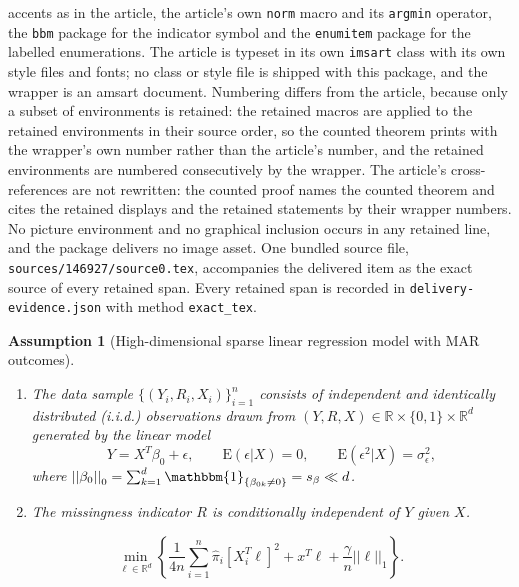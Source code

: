 \documentclass[10pt,a4paper]{amsart}
\theoremstyle{plain}
\newtheorem{assumption}{Assumption}
\theoremstyle{remark}
\renewcommand{\hat}{\widehat}
\newcommand{\norm}[1]{\left|\left| #1 \right|\right|}
\begin{document}
accents as in the article, the article's own \texttt{norm} macro and its \texttt{argmin} operator, the \texttt{bbm} package for the indicator symbol and the \texttt{enumitem} package for the labelled enumerations. The article is typeset in its own \texttt{imsart} class with its own style files and fonts; no class or style file is shipped with this package, and the wrapper is an amsart document. Numbering differs from the article, because only a subset of environments is retained: the retained macros are applied to the retained environments in their source order, so the counted theorem prints with the wrapper's own number rather than the article's number, and the retained environments are numbered consecutively by the wrapper. The article's cross-references are not rewritten: the counted proof names the counted theorem and cites the retained displays and the retained statements by their wrapper numbers. No picture environment and no graphical inclusion occurs in any retained line, and the package delivers no image asset. One bundled source file, \texttt{sources/146927/source0.tex}, accompanies the delivered item as the exact source of every retained span. Every retained span is recorded in \texttt{delivery-evidence.json} with method \texttt{exact\_tex}.
\begin{assumption}[High-dimensional sparse linear regression model with MAR outcomes] 
	\leavevmode %
	\begin{enumerate}[label=(\alph*)]
		\label{assump:basic}
		\item The data sample $\{(Y_i,R_i,X_i)\}_{i=1}^n$ consists of independent and identically distributed (i.i.d.) observations drawn from $(Y, R, X) \in \mathbb{R} \times \{0,1\} \times \mathbb{R}^d$ generated by the linear model
		\begin{equation}
			\label{linear_reg}
			Y = X^T\beta_0 + \epsilon, \quad \quad \mathrm{E}\left(\epsilon \big| X\right) = 0, \quad\quad \mathrm{E}\left(\epsilon^2 \big| X\right) = \sigma_{\epsilon}^2, 
		\end{equation}
		where $\norm{\beta_0}_0 = \sum_{k=1}^d \mathbbm{1}_{\{\beta_{0k} \neq 0\}} = s_{\beta} \ll d$. 
		
		\item The missingness indicator $R$ is conditionally independent of $Y$ given $X$.
	\end{enumerate}
\end{assumption}

	\begin{equation}
		\label{debias_prog_dual}
		\min_{\ell \in \mathbb{R}^d} \left\{\frac{1}{4n} \sum_{i=1}^n \hat{\pi}_i \left[X_i^T \ell\right]^2 + x^T \ell +\frac{\gamma}{n}\norm{\ell}_1 \right\}.
	\end{equation}
\end{document}
